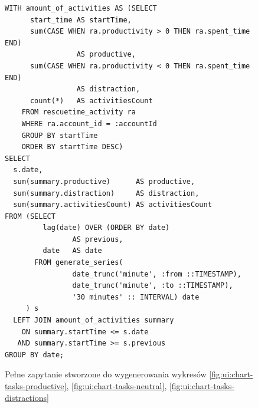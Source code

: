 \documentclass[openright]{xmgr}
\begin{document}
\begin{figure}

\begin{verbatim}
WITH amount_of_activities AS (SELECT
      start_time AS startTime,
      sum(CASE WHEN ra.productivity > 0 THEN ra.spent_time END)
                 AS productive,
      sum(CASE WHEN ra.productivity < 0 THEN ra.spent_time END)
                 AS distraction,
      count(*)   AS activitiesCount
    FROM rescuetime_activity ra
    WHERE ra.account_id = :accountId
    GROUP BY startTime
    ORDER BY startTime DESC)
SELECT
  s.date,
  sum(summary.productive)      AS productive,
  sum(summary.distraction)     AS distraction,
  sum(summary.activitiesCount) AS activitiesCount
FROM (SELECT
         lag(date) OVER (ORDER BY date)
                AS previous,
         date   AS date
       FROM generate_series(
                date_trunc('minute', :from ::TIMESTAMP),
                date_trunc('minute', :to ::TIMESTAMP),
                '30 minutes' :: INTERVAL) date
     ) s
  LEFT JOIN amount_of_activities summary
    ON summary.startTime <= s.date
   AND summary.startTime >= s.previous
GROUP BY date;
\end{verbatim}
\caption{Pełne zapytanie stworzone do wygenerowania wykresów \ref{fig:ui:chart-tasks-productive}, \ref{fig:ui:chart-tasks-neutral}, \ref{fig:ui:chart-tasks-distractions}}
\end{figure}
\end{document}
